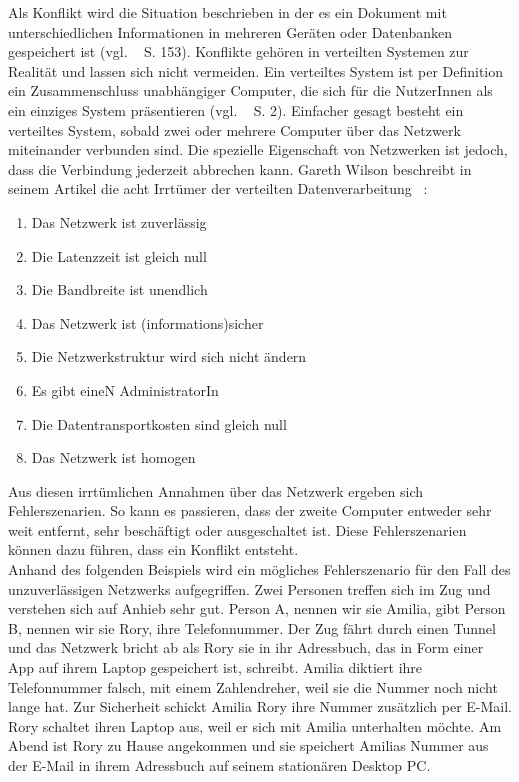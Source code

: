 Als Konflikt wird die Situation beschrieben in der es ein Dokument mit unterschiedlichen Informationen in mehreren Geräten oder Datenbanken gespeichert ist (vgl. ~\cite{couchDB} S. 153).
Konflikte gehören in verteilten Systemen zur Realität und lassen sich nicht vermeiden.
Ein verteiltes System ist per Definition ein Zusammenschluss unabhängiger Computer, die sich für die NutzerInnen als ein einziges System präsentieren (vgl. ~\cite{tanenbaum} S. 2).
Einfacher gesagt besteht ein verteiltes System, sobald zwei oder mehrere Computer über das Netzwerk miteinander verbunden sind.
Die spezielle Eigenschaft von Netzwerken ist jedoch, dass die Verbindung jederzeit abbrechen kann.
Gareth Wilson beschreibt in seinem Artikel die acht Irrtümer der verteilten Datenverarbeitung ~\cite{fallacies}:
\begin{enumerate}
  \item Das Netzwerk ist zuverlässig
  \item Die \gls{Latenz}zeit ist gleich null
  \item Die Bandbreite ist unendlich
  \item Das Netzwerk ist (informations)sicher
  \item Die Netzwerkstruktur wird sich nicht ändern
  \item Es gibt eineN AdministratorIn
  \item Die Datentransportkosten sind gleich null
  \item Das Netzwerk ist homogen
\end{enumerate}
Aus diesen irrtümlichen Annahmen über das Netzwerk ergeben sich Fehlerszenarien. So kann es passieren, dass der zweite Computer entweder sehr weit entfernt, sehr beschäftigt oder ausgeschaltet ist. Diese Fehlerszenarien können dazu führen, dass ein Konflikt entsteht.\\
Anhand des folgenden Beispiels wird ein mögliches Fehlerszenario für den Fall des unzuverlässigen Netzwerks aufgegriffen.
Zwei Personen treffen sich im Zug und verstehen sich auf Anhieb sehr gut. Person A, nennen wir sie Amilia, gibt Person B, nennen wir sie Rory, ihre Telefonnummer. Der Zug fährt durch einen Tunnel und das Netzwerk bricht ab als Rory sie in ihr Adressbuch, das in Form einer \gls{App} auf ihrem Laptop gespeichert ist, schreibt.
Amilia diktiert ihre Telefonnummer falsch, mit einem Zahlendreher, weil sie die Nummer noch nicht lange hat.
Zur Sicherheit schickt Amilia Rory ihre Nummer zusätzlich per E-Mail. Rory schaltet ihren Laptop aus, weil er sich mit Amilia unterhalten möchte.
Am Abend ist Rory zu Hause angekommen und sie speichert Amilias Nummer aus der E-Mail in ihrem Adressbuch auf seinem stationären Desktop PC.
